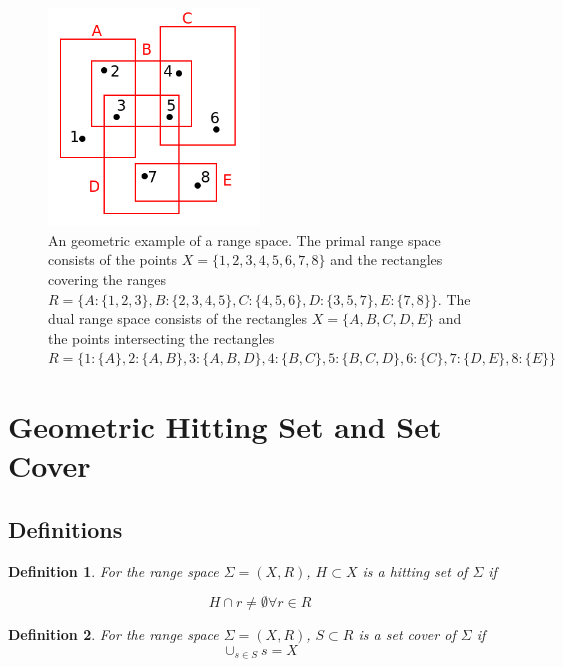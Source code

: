 \documentclass[11pt]{article}
\newtheorem{definition}{Definition}
\begin{document}
\begin{figure}[h]
\centering
\includegraphics[width=0.5\textwidth]{RectanglePoints.png}
\caption{An geometric example of a range space.  The primal range space consists of the points $X = \{ 1, 2, 3, 4, 5, 6, 7, 8 \}$ and the rectangles covering the ranges  $R = \{ A:\{1, 2, 3\}, B:\{2, 3, 4, 5\}, C:\{4, 5, 6\}, D:\{3, 5, 7\}, E:\{7, 8\} \}$.  The dual range space consists of the rectangles $X = \{ A, B, C, D, E \}$ and the points intersecting the rectangles $R = \{ 1:\{A\}, 2:\{A, B\}, 3:\{A, B, D\}, 4:\{B, C\}, 5:\{B, C, D\}, 6:\{C\}, 7:\{D, E\}, 8:\{E\} \}$ }
\label{fig:RectanglePoints}
\end{figure}

\section{Geometric Hitting Set and Set Cover}
\subsection{Definitions}

\begin{definition}

For the range space $\Sigma = (X, R)$, $H \subset X$ is a {\em hitting set of $\Sigma$} if 

\[ H \cap r \neq \emptyset \forall r \in R \]

\end{definition}


\begin{definition}

For the range space $\Sigma = (X, R)$, $S \subset R$ is a {\em set cover of $\Sigma$} if
\[ \cup_{s \in S} s = X \]

\end{definition}
\end{document}
